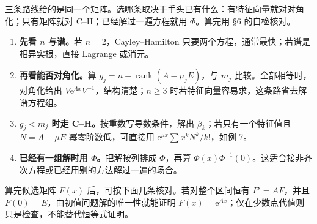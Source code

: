 \documentclass[11pt]{ctexart}
\let\basesubhdr\subhdr
\renewcommand{\subhdr}[1]{\needspace{8\baselineskip}\basesubhdr{#1}}
\let\basehdr\hdr
\renewcommand{\hdr}[2]{\needspace{11\baselineskip}\basehdr{#1}{#2}}
\DeclareMathOperator{\rank}{rank}
\newcommand{\ee}{\mathrm{e}}
\begin{document}
三条路线给的是同一个矩阵。选哪条取决于手头已有什么：有特征向量就对对角化；只有矩阵就对 C--H；已经解过一遍方程就用 $\Phi$。算完用 §6 的自检核对。



\begin{enumerate}
  \item \textbf{先看 $n$ 与谱。}若 $n=2$，Cayley--Hamilton 只要两个方程，通常最快；若谱是相异实根，直接 Lagrange 或消元。
  \item \textbf{再看能否对角化。}算 $g_j=n-\rank(A-\mu_jE)$，与 $m_j$ 比较。全部相等时，对角化给出 $V\ee^{\Lambda x}V^{-1}$，结构清楚；$n\ge3$ 时若特征向量容易求，这条路省去解谱方程组。
  \item \textbf{$g_j<m_j$ 时走 C--H。}按重数写导数条件，解出 $\beta_k$；若只有一个特征值且 $N=A-\mu E$ 幂零阶数低，可直接用 $\ee^{\mu x}\sum x^kN^k/k!$，如例 7。
  \item \textbf{已经有一组解时用 $\Phi$。}把解按列排成 $\Phi$，再算 $\Phi(x)\Phi^{-1}(0)$。这适合接非齐次方程或已经用别的方法解过一遍的场合。
\end{enumerate}


算完候选矩阵 $F(x)$ 后，可按下面几条核对。若对整个区间恒有 $F'=AF$，并且 $F(0)=E$，由初值问题解的唯一性就能证明 $F(x)=\ee^{Ax}$；仅在少数点代值则只是检查，不能替代恒等式证明。
\end{document}
